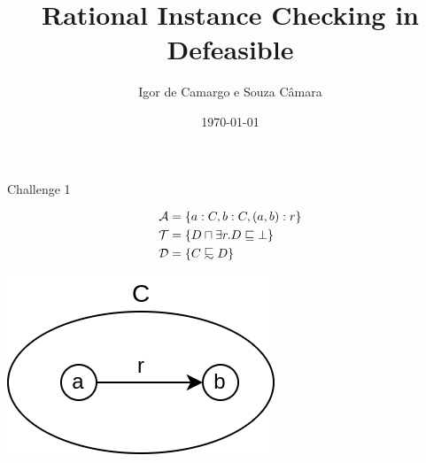\documentclass[10pt]{beamer}
\title{Rational Instance Checking in Defeasible \ELIbot}
\date{\today}
\author{Igor de Camargo e Souza Câmara}
\institute{University of São Paulo}
\begin{document}
\begin{frame}[plain]
  \titlepage
\end{frame}

\begin{frame}[fragile]{Challenge 1}

\begin{align*}
  & \Amc = \{a:C, b:C, (a, b):r\} \\
  & \Tmc = \{D \sqcap \exists r.D \sqsubseteq \bot \} \\
  & \Dmc = \{C \definc D\}
\end{align*}

\pause

\begin{center}
  \includegraphics[scale=0.5]{img/challenge1_1.png}
  \end{center}

\end{frame}
\end{document}
